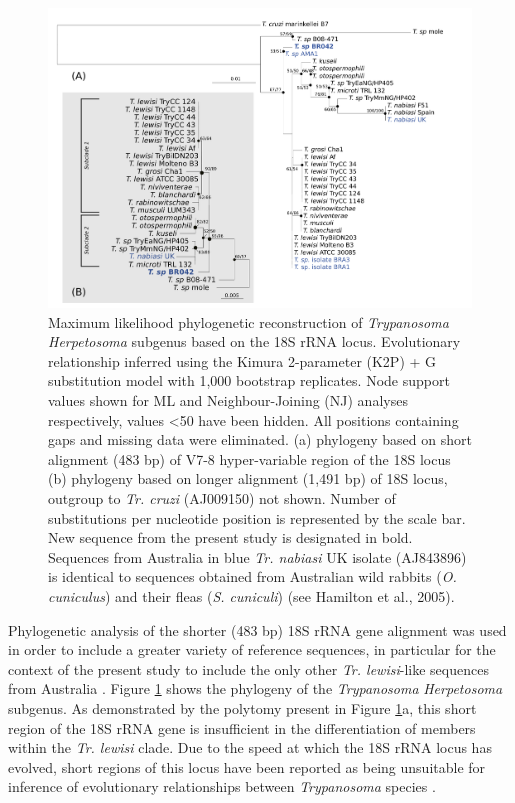 \documentclass[a4paper, nobind]{templates/ociamthesis}
\begin{document}
\begin{figure}
\includegraphics[width=0.95\linewidth]{figures/ms-figs/Ch5-Fig1} \caption[Phylogeny of \textit{Trypanosoma Herpetosoma} subgenus based on the 18S rRNA locus.]{Maximum likelihood phylogenetic reconstruction of \textit{Trypanosoma Herpetosoma} subgenus based on the 18S rRNA locus. Evolutionary relationship inferred using the Kimura 2-parameter (K2P) + G substitution model with 1,000 bootstrap replicates. Node support values shown for ML and Neighbour-Joining (NJ) analyses respectively, values <50 have been hidden. All positions containing gaps and missing data were eliminated. (a) phylogeny based on short alignment (483 bp) of V7-8 hyper-variable region of the 18S locus (b) phylogeny based on longer alignment (1,491 bp) of 18S locus, outgroup to \textit{Tr. cruzi} (AJ009150) not shown. Number of substitutions per nucleotide position is represented by the scale bar. New sequence from the present study is designated in bold. Sequences from Australia in blue \textit{Tr. nabiasi} UK isolate (AJ843896) is identical to sequences obtained from Australian wild rabbits (\textit{O. cuniculus}) and their fleas (\textit{S. cuniculi}) (see Hamilton et al., 2005).}\label{fig:F51}
\end{figure}

Phylogenetic analysis of the shorter (483 bp) 18S rRNA gene alignment was used in order to include a greater variety of reference sequences, in particular for the context of the present study to include the only other \emph{Tr. lewisi}-like sequences from Australia \autocite{hamiltonInadvertentIntroductionAustralia2005,averisDiversityDistributionHostparasite2009}. Figure \ref{fig:F51} shows the phylogeny of the \emph{Trypanosoma} \emph{Herpetosoma} subgenus. As demonstrated by the polytomy present in Figure \ref{fig:F51}a, this short region of the 18S rRNA gene is insufficient in the differentiation of members within the \emph{Tr. lewisi} clade. Due to the speed at which the 18S rRNA locus has evolved, short regions of this locus have been reported as being unsuitable for inference of evolutionary relationships between \emph{Trypanosoma} species \autocite{hamiltonResolvingRelationshipsAustralian2011}.
\end{document}
